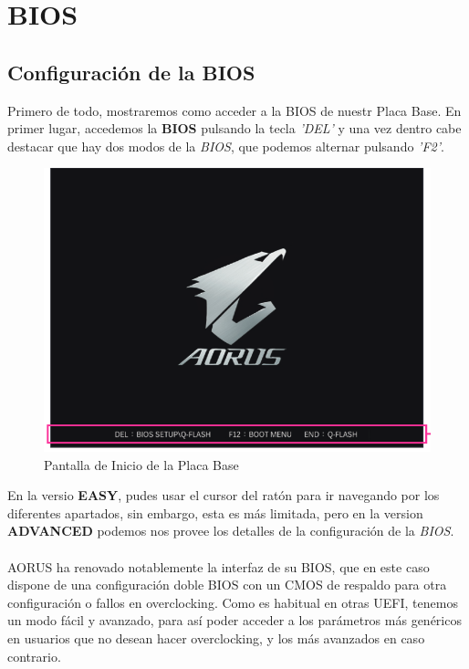 \documentclass{article}
\begin{document}
     \newpage   
      \section{BIOS}
        \subsection{Configuración de la BIOS}
          Primero de todo, mostraremos como acceder a la BIOS de nuestr Placa Base. En primer lugar, accedemos la \textbf{BIOS} pulsando la tecla \textit{'DEL'} y una vez dentro cabe destacar que hay dos modos de la \textit{BIOS}, que podemos alternar 
          pulsando \textit{'F2'}.
          \begin{figure}[h]
            \centering
            \includegraphics[scale = 0.5]{img/BIOS_START.png}
            \caption{Pantalla de Inicio de la Placa Base}
          \end{figure} 
          En la versio \textbf{EASY}, pudes usar el cursor del ratón para ir navegando por los diferentes apartados, sin embargo, esta es más limitada, pero en la version \textbf{ADVANCED} podemos nos provee los detalles de la configuración de la \textit{BIOS}.
          \\\\
          AORUS ha renovado notablemente la interfaz de su BIOS, que en este caso dispone de una configuración doble BIOS con un CMOS de respaldo para otra configuración o fallos en overclocking. Como es habitual en otras UEFI, tenemos un modo fácil y 
          avanzado, para así poder acceder a los parámetros más genéricos en usuarios que no desean hacer overclocking, y los más avanzados en caso contrario.\\
\end{document}
